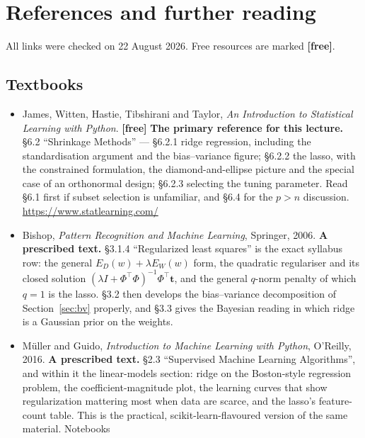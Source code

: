 \documentclass[11pt]{article}
\begin{document}
\section{References and further reading}

All links were checked on 22 August 2026. Free resources are marked
\textbf{[free]}.

\subsection*{Textbooks}

\begin{itemize}[leftmargin=*]
  \item James, Witten, Hastie, Tibshirani and Taylor, \emph{An Introduction to
    Statistical Learning with Python}. \textbf{[free]} \textbf{The primary
    reference for this lecture.} \S6.2 ``Shrinkage Methods'' --- \S6.2.1 ridge
    regression, including the standardisation argument and the bias--variance
    figure; \S6.2.2 the lasso, with the constrained formulation, the
    diamond-and-ellipse picture and the special case of an orthonormal design;
    \S6.2.3 selecting the tuning parameter. Read \S6.1 first if subset
    selection is unfamiliar, and \S6.4 for the $p>n$ discussion.
    \url{https://www.statlearning.com/}
  \item Bishop, \emph{Pattern Recognition and Machine Learning}, Springer,
    2006. \textbf{A prescribed text.} \S3.1.4 ``Regularized least squares'' is
    the exact syllabus row: the general
    $E_D(w) + \lambda E_W(w)$ form, the quadratic regulariser and its closed
    solution $(\lambda I + \Phi^{\!\top}\Phi)^{-1}\Phi^{\!\top}\mathbf{t}$,
    and the general $q$-norm penalty of which $q=1$ is the lasso. \S3.2 then
    develops the bias--variance decomposition of Section~\ref{sec:bv}
    properly, and \S3.3 gives the Bayesian reading in which ridge is a
    Gaussian prior on the weights.
  \item M\"uller and Guido, \emph{Introduction to Machine Learning with
    Python}, O'Reilly, 2016. \textbf{A prescribed text.} \S2.3 ``Supervised
    Machine Learning Algorithms'', and within it the linear-models section:
    ridge on the Boston-style regression problem, the coefficient-magnitude
    plot, the learning curves that show regularization mattering most when
    data are scarce, and the lasso's feature-count table. This is the
    practical, scikit-learn-flavoured version of the same material. Notebooks

\end{itemize}
\end{document}
